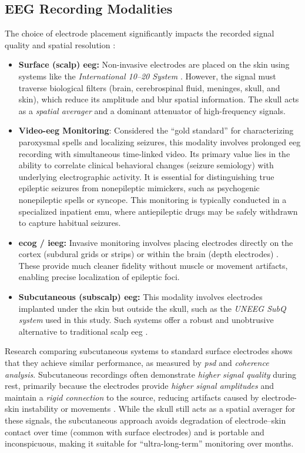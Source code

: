 \subsection{EEG Recording Modalities}
The choice of electrode placement significantly impacts the recorded signal quality and spatial resolution \parencite{st_louis_electroencephalography_2016}:
\begin{itemize}
    \item \textbf{Surface (scalp) \gls{eeg}:} Non-invasive electrodes are placed on the skin using systems like the \textit{International 10--20 System} \parencite{klem_ten-twenty_1999}.
    However, the signal must traverse biological filters (brain, cerebrospinal fluid, meninges, skull, and skin), which reduce its amplitude and blur spatial information. 
    The skull acts as a \textit{spatial averager} and a dominant attenuator of high-frequency signals.
    \item \textbf{Video-\gls{eeg} Monitoring}: Considered the \enquote{gold standard} for characterizing paroxysmal spells and localizing seizures, this modality involves prolonged \gls{eeg} recording with simultaneous time-linked video. 
    Its primary value lies in the ability to correlate clinical behavioral changes (seizure semiology) with underlying electrographic activity. 
    It is essential for distinguishing true epileptic seizures from nonepileptic mimickers, such as psychogenic nonepileptic spells or syncope. 
    This monitoring is typically conducted in a specialized inpatient \gls{emu}, where antiepileptic drugs may be safely withdrawn to capture habitual seizures.
    \item \textbf{\Gls{ecog} / \gls{ieeg}:} Invasive monitoring involves placing electrodes directly on the cortex (subdural grids or strips) or within the brain (depth electrodes) \parencite{jayakar_diagnostic_2016}. 
    These provide much cleaner fidelity without muscle or movement artifacts, enabling precise localization of epileptic foci.
    \item \textbf{Subcutaneous (subscalp) \gls{eeg}:} This modality involves electrodes implanted under the skin but outside the skull, such as the \textit{UNEEG SubQ system} used in this study.
    Such systems offer a robust and unobtrusive alternative to traditional scalp \gls{eeg} \parencite{duun-henriksen_subdural_2013}.
\end{itemize}

Research comparing subcutaneous systems to standard surface electrodes shows that they achieve similar performance, as measured by \textit{\gls{psd}} and \textit{coherence analysis}.
Subcutaneous recordings often demonstrate \textit{higher signal quality} during rest, primarily because the electrodes provide \textit{higher signal amplitudes} and maintain a \textit{rigid connection} to the source, reducing artifacts caused by electrode-skin instability or movements \parencite{duun-henriksen_eeg_2015}.
While the skull still acts as a spatial averager for these signals, the subcutaneous approach avoids degradation of electrode--skin contact over time (common with surface electrodes) and is portable and inconspicuous, making it suitable for \enquote{ultra-long-term} monitoring over months.



